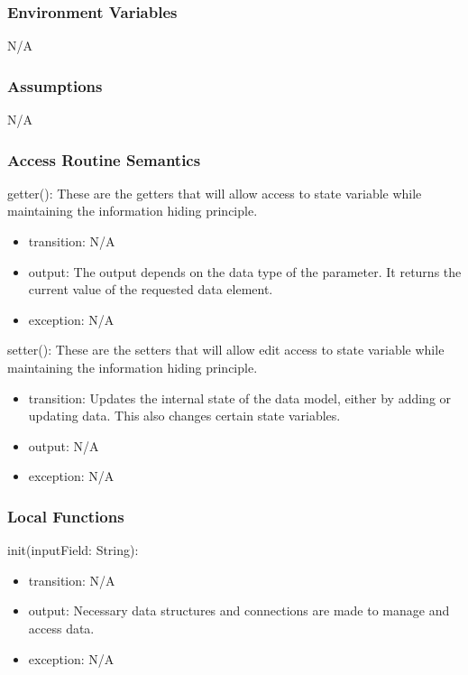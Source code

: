 \documentclass[12pt, titlepage]{article}
\begin{document}
\subsubsection{Environment Variables}

N/A

\subsubsection{Assumptions}

N/A

\subsubsection{Access Routine Semantics}

\noindent getter(): These are the getters that will allow access to state variable while maintaining the information hiding principle.
\begin{itemize}
    \item transition: N/A
    \item output: The output depends on the data type of the parameter. It returns the current value of the requested data element.
    \item exception: N/A
\end{itemize}

\noindent setter(): These are the setters that will allow edit access to state variable while maintaining the information hiding principle.
\begin{itemize}
    \item transition: Updates the internal state of the data model, either by adding or updating data. This also changes certain state variables.
    \item output: N/A
    \item exception: N/A
\end{itemize}

\subsubsection{Local Functions}

\noindent init(inputField: String):
\begin{itemize}
\item transition: N/A
\item output: Necessary data structures and connections are made to manage and access data.
\item exception: N/A
\end{itemize}
\end{document}
